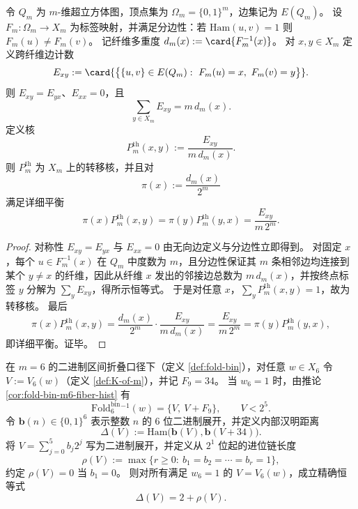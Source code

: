 \begin{proposition}\label{prop:fold-thermal-kernel-from-edge-count}
令 \(Q_m\) 为 \(m\)-维超立方体图，顶点集为 \(\Omega_m=\{0,1\}^m\)，边集记为 \(E(Q_m)\)。
设 \(F_m:\Omega_m\to X_m\) 为标签映射，并满足分边性：若 \(\mathrm{Ham}(u,v)=1\) 则 \(F_m(u)\neq F_m(v)\)。
记纤维多重度
\(
d_m(x):=\card{F_m^{-1}(x)}
\)。
对 \(x,y\in X_m\) 定义跨纤维边计数
\[
E_{xy}:=\card{\bigl\{\{u,v\}\in E(Q_m):\ F_m(u)=x,\ F_m(v)=y\bigr\}}.
\]
则 \(E_{xy}=E_{yx}\)、\(E_{xx}=0\)，且
\[
\sum_{y\in X_m}E_{xy}=m\,d_m(x).
\]
定义核
\[
P_m^{\mathrm{th}}(x,y):=\frac{E_{xy}}{m\,d_m(x)}.
\]
则 \(P_m^{\mathrm{th}}\) 为 \(X_m\) 上的转移核，并且对
\[
\pi(x):=\frac{d_m(x)}{2^m}
\]
满足详细平衡
\[
\pi(x)P_m^{\mathrm{th}}(x,y)=\pi(y)P_m^{\mathrm{th}}(y,x)=\frac{E_{xy}}{m\,2^m}.
\]
\end{proposition}

\begin{proof}
对称性 \(E_{xy}=E_{yx}\) 与 \(E_{xx}=0\) 由无向边定义与分边性立即得到。
对固定 \(x\)，每个 \(u\in F_m^{-1}(x)\) 在 \(Q_m\) 中度数为 \(m\)，且分边性保证其 \(m\) 条相邻边均连接到某个 \(y\neq x\) 的纤维，因此从纤维 \(x\) 发出的邻接边总数为 \(m\,d_m(x)\)，并按终点标签 \(y\) 分解为 \(\sum_y E_{xy}\)，得所示恒等式。
于是对任意 \(x\)，\(\sum_y P_m^{\mathrm{th}}(x,y)=1\)，故为转移核。
最后
\[
\pi(x)P_m^{\mathrm{th}}(x,y)
=\frac{d_m(x)}{2^m}\cdot\frac{E_{xy}}{m\,d_m(x)}
=\frac{E_{xy}}{m\,2^m}
=\pi(y)P_m^{\mathrm{th}}(y,x),
\]
即详细平衡。证毕。
\end{proof}

\begin{theorem}[dyadic uplift 位移的进位控制：\(m=6\) 的纤维内汉明距离闭式]\label{thm:foldbin6-carry-hamming-distance}
在 \(m=6\) 的二进制区间折叠口径下（定义 \ref{def:fold-bin}），对任意 \(w\in X_6\) 令
\(
V:=V_6(w)
\)（定义 \ref{def:K-of-m}），并记 \(F_9=34\)。
当 \(w_6=1\) 时，由推论 \ref{cor:fold-bin-m6-fiber-hist} 有
\[
\mathrm{Fold}^{\mathrm{bin}}_6{}^{-1}(w)=\{V,\ V+F_9\},
\qquad
V<2^5.
\]
令 \(\mathbf b(n)\in\{0,1\}^6\) 表示整数 \(n\) 的 \(6\) 位二进制展开，并定义内部汉明距离
\[
\Delta(V):=\mathrm{Ham}\bigl(\mathbf b(V),\mathbf b(V+34)\bigr).
\]
将 \(V=\sum_{j=0}^{5}b_j2^j\) 写为二进制展开，并定义从 \(2^1\) 位起的进位链长度
\[
\rho(V):=\max\{r\ge 0:\ b_1=b_2=\cdots=b_r=1\},
\]
约定 \(\rho(V)=0\) 当 \(b_1=0\)。
则对所有满足 \(w_6=1\) 的 \(V=V_6(w)\)，成立精确恒等式
\[
\Delta(V)=2+\rho(V).
\]
\end{theorem}

